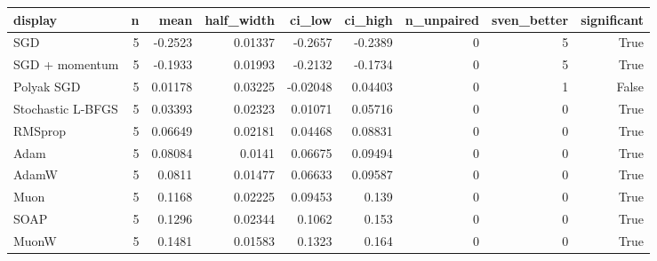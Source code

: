 \begin{tabular}{lrrrrrrrr}
\toprule
display & n & mean & half\_width & ci\_low & ci\_high & n\_unpaired & sven\_better & significant \\
\midrule
SGD & 5 & -0.2523 & 0.01337 & -0.2657 & -0.2389 & 0 & 5 & True \\
SGD + momentum & 5 & -0.1933 & 0.01993 & -0.2132 & -0.1734 & 0 & 5 & True \\
Polyak SGD & 5 & 0.01178 & 0.03225 & -0.02048 & 0.04403 & 0 & 1 & False \\
Stochastic L-BFGS & 5 & 0.03393 & 0.02323 & 0.01071 & 0.05716 & 0 & 0 & True \\
RMSprop & 5 & 0.06649 & 0.02181 & 0.04468 & 0.08831 & 0 & 0 & True \\
Adam & 5 & 0.08084 & 0.0141 & 0.06675 & 0.09494 & 0 & 0 & True \\
AdamW & 5 & 0.0811 & 0.01477 & 0.06633 & 0.09587 & 0 & 0 & True \\
Muon & 5 & 0.1168 & 0.02225 & 0.09453 & 0.139 & 0 & 0 & True \\
SOAP & 5 & 0.1296 & 0.02344 & 0.1062 & 0.153 & 0 & 0 & True \\
MuonW & 5 & 0.1481 & 0.01583 & 0.1323 & 0.164 & 0 & 0 & True \\
\bottomrule
\end{tabular}
